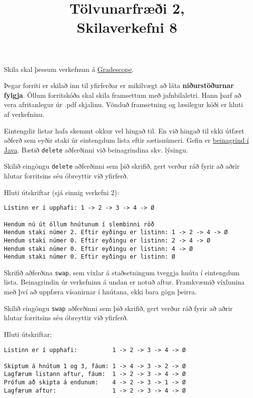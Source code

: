 \documentclass{article}
\title{Tölvunarfræði 2, \semester \\ Skilaverkefni 8}
\author{}
\begin{document}
\maketitle
{}

Skila skal þessum verkefnum á \href{https://gradescope.com/courses/14122}{Gradescope}.

Þegar forriti er skilað inn til yfirferðar er mikilvægt að láta \textbf{niðurstöðurnar fylgja}. Öllum forritskóða skal skila framsettum með jafnbilaletri. Hann þarf að vera afritanlegur úr .pdf skjalinu. Vönduð framsetning og læsilegur kóði er hluti af verkefninu.

\question

Eintengdir listar hafa skemmt okkur vel hingað til. En við hingað til ekki útfært aðferð sem eyðir staki úr eintengdum lista eftir sætisnúmeri. Gefin er \href{https://raw.githubusercontent.com/Ernir/kennsluefni/master/T2/Code/w9/SinglyLinkedList.java}{beinagrind í Java}. Bætið \texttt{delete} aðferðinni við beinagrindina skv. lýsingu.

Skilið eingöngu \texttt{delete} aðferðinni sem þið skrifið, gert verður ráð fyrir að aðrir hlutar forritsins séu óbreyttir við yfirferð.

Hluti útskriftar (sjá einnig verkefni 2):

\begin{verbatim}
Listinn er í upphafi: 1 -> 2 -> 3 -> 4 -> Ø

Hendum nú út öllum hnútunum í slembinni röð
Hendum staki númer 2. Eftir eyðingu er listinn: 1 -> 2 -> 4 -> Ø
Hendum staki númer 0. Eftir eyðingu er listinn: 2 -> 4 -> Ø
Hendum staki númer 0. Eftir eyðingu er listinn: 4 -> Ø
Hendum staki númer 0. Eftir eyðingu er listinn: Ø
\end{verbatim}

\question

Skrifið aðferðina \texttt{swap}, sem víxlar á staðsetningum tveggja hnúta í eintengdum lista. Beinagrindin úr verkefninu á undan er notuð aftur. Framkvæmið víxlunina með því að uppfæra vísanirnar í hnútana, ekki bara gögn þeirra.

Skilið eingöngu \texttt{swap} aðferðinni sem þið skrifið, gert verður ráð fyrir að aðrir hlutar forritsins séu óbreyttir við yfirferð.

Hluti útskriftar:

\begin{verbatim}
Listinn er í upphafi:          1 -> 2 -> 3 -> 4 -> Ø

Skiptum á hnútum 1 og 3, fáum: 1 -> 4 -> 3 -> 2 -> Ø
Lagfærum listann aftur, fáum:  1 -> 2 -> 3 -> 4 -> Ø
Prófum að skipta á endunum:    4 -> 2 -> 3 -> 1 -> Ø
Lagfærum aftur:                1 -> 2 -> 3 -> 4 -> Ø
\end{verbatim}
\end{document}
